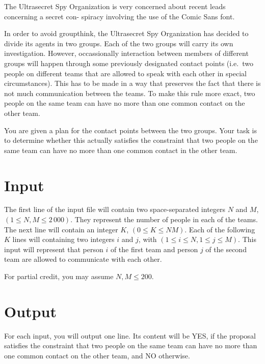 The Ultrasecret Spy Organization is very concerned about recent leads concerning a secret con-
spiracy involving the use of the Comic Sans font.

In order to avoid groupthink, the Ultrasecret Spy Organization has decided to divide its agents in
two groups. Each of the two groups will carry its own investigation. However, occassionally
interaction between members of different groups will happen through some previously designated
contact points (i.e.\ two people on different teams that are allowed to speak with each other in
special circumstances). This has to be made in a way that preserves the fact that there is not much
communication between the teams. To make this rule more exact, two people on the same team can have
no more than one common contact on the other team.

You are given a plan for the contact points between the two groups. Your task is to determine
whether this actually satisfies the constraint that two people on the same team can have no more
than one common contact in the other team.

\section*{Input}
The first line of the input file will contain two space-separated integers $N$ and $M$, $(1 \le N, M
\le 2\,000)$. They represent the number of people in each of the teams. The next line will contain an
integer $K$, $(0 \le K \le NM)$. Each of the following $K$ lines will containing two integers $i$
and $j$, with $(1 \le i \le N, 1 \le j \le M)$. This input will represent that person $i$ of the
first team and person $j$ of the second team are allowed to communicate with each other.

For partial credit, you may assume $N, M \le 200$.

\section*{Output}
For each input, you will output one line. Its content will be YES, if the proposal satisfies the
constraint that two people on the same team can have no more than one common contact on the
other team, and NO otherwise.
